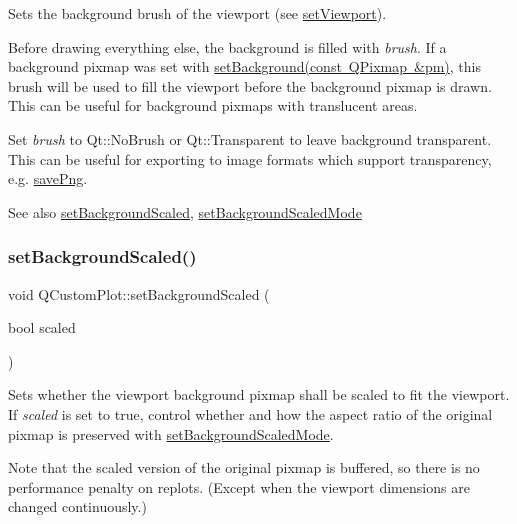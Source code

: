 Sets the background brush of the viewport (see \mbox{\hyperlink{class_q_custom_plot_a3f9bc4b939dd8aaba9339fd09f273fc4}{set\+Viewport}}).

Before drawing everything else, the background is filled with {\itshape brush}. If a background pixmap was set with \mbox{\hyperlink{class_q_custom_plot_a130358592cfca353ff3cf5571b49fb00}{set\+Background(const Q\+Pixmap \&pm)}}, this brush will be used to fill the viewport before the background pixmap is drawn. This can be useful for background pixmaps with translucent areas.

Set {\itshape brush} to Qt\+::\+No\+Brush or Qt\+::\+Transparent to leave background transparent. This can be useful for exporting to image formats which support transparency, e.\+g. \mbox{\hyperlink{class_q_custom_plot_a7636261aff1f6d25c9da749ece3fc8b8}{save\+Png}}.

\begin{DoxySeeAlso}{See also}
\mbox{\hyperlink{class_q_custom_plot_a36f0fa1317325dc7b7efea615ee2de1f}{set\+Background\+Scaled}}, \mbox{\hyperlink{class_q_custom_plot_a4c0eb4865b7949f62e1cb97db04a3de0}{set\+Background\+Scaled\+Mode}} 
\end{DoxySeeAlso}
\mbox{\label{class_q_custom_plot_a36f0fa1317325dc7b7efea615ee2de1f}} 
\subsubsection{\texorpdfstring{set\+Background\+Scaled()}{setBackgroundScaled()}}
{\footnotesize\ttfamily void Q\+Custom\+Plot\+::set\+Background\+Scaled (\begin{DoxyParamCaption}\item[{bool}]{scaled }\end{DoxyParamCaption})}

Sets whether the viewport background pixmap shall be scaled to fit the viewport. If {\itshape scaled} is set to true, control whether and how the aspect ratio of the original pixmap is preserved with \mbox{\hyperlink{class_q_custom_plot_a4c0eb4865b7949f62e1cb97db04a3de0}{set\+Background\+Scaled\+Mode}}.

Note that the scaled version of the original pixmap is buffered, so there is no performance penalty on replots. (Except when the viewport dimensions are changed continuously.)

